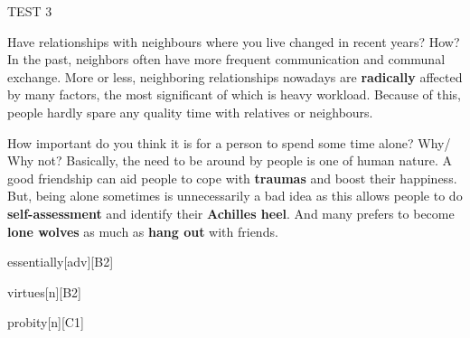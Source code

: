 \begin{glossarymc}[Cambridge 5]
\begin{test}{TEST 3}
    \begin{qa}{Have relationships with neighbours where you live changed in recent years? How?}
        In the past, neighbors often have more frequent communication and communal exchange. More or less, neighboring relationships nowadays are \textbf{radically} affected by many factors, the most significant of which is heavy workload. Because of this, people hardly spare any quality time with relatives or neighbours.
    \end{qa}

    \begin{qa}{How important do you think it is for a person to spend some time alone? Why/ Why not?}
        Basically, the need to be around by people is one of human nature. A good friendship can aid people to cope with \textbf{traumas} and boost their happiness. But, being alone sometimes is unnecessarily a bad idea as this allows people to do \textbf{self-assessment} and identify their \textbf{Achilles heel}. And many prefers to become \textbf{lone wolves} as much as \textbf{hang out} with friends.
    \end{qa}

        \begin{VocabExplain}[Part 3]
            \begin{ExplainCard}{essentially}[adv][B2]
            \end{ExplainCard}

            \begin{ExplainCard}{virtues}[n][B2]
            \end{ExplainCard}

            \begin{ExplainCard}{probity}[n][C1]
            \end{ExplainCard}


\end{VocabExplain}
\end{test}
\end{glossarymc}
